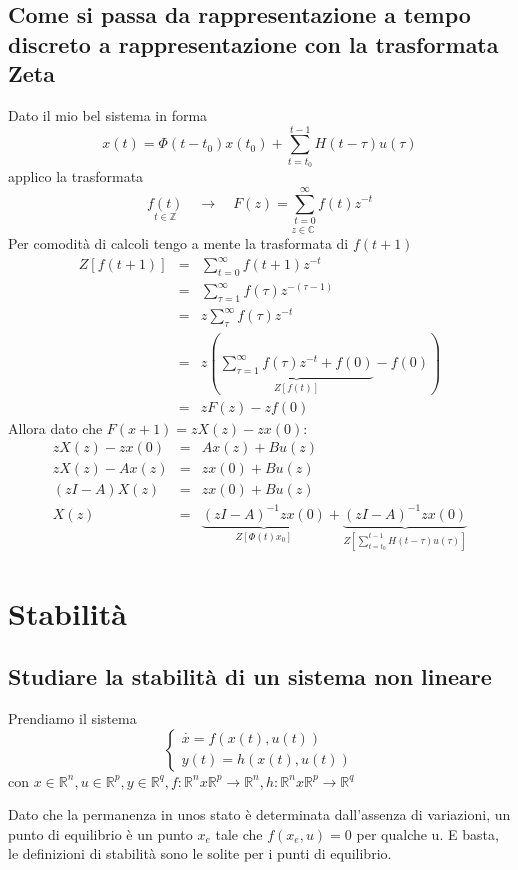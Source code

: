 \documentclass{article}
\begin{document}
\subsection{Come si passa da rappresentazione a tempo discreto a rappresentazione con la trasformata Zeta}

Dato il mio bel sistema in forma
\[
    x(t) = \Phi(t-t_0)x(t_0)+\sum_{t=t_0}^{t-1}H(t-\tau)u(\tau)
\]
applico la trasformata
\[
    \underset{t\in\mathbb{Z}}{f(t)}\quad\to\quad
    \underset{z\in\mathbb{C}}{F(z)=\sum_{t=0}^{\infty}f(t)z^{-t}}
\]
Per comodità di calcoli tengo a mente la trasformata di $f(t+1)$
\begin{align*}
    Z[f(t+1)] &=&\sum_{t=0}^{\infty}f(t+1)z^{-t}\\
    &=&\sum_{\tau=1}^{\infty}f(\tau)z^{-(\tau-1)}\\
    &=&z\sum_{\tau}^{\infty}f(\tau)z^{-t}\\
    &=&z\left( \underbrace{\sum_{\tau=1}^{\infty}f(\tau) z^{-t}+f(0)}_{Z[f(t)]}-f(0) \right)\\
    &=&zF(z)-zf(0)
\end{align*}
Allora dato che $F(x+1) = zX(z)-zx(0)$:
\begin{align*}
    zX(z)-zx(0) &=& Ax(z)+Bu(z)\\
    zX(z)-Ax(z) &=& zx(0)+Bu(z)\\
    (zI-A)X(z) &=& zx(0)+Bu(z)\\
    X(z) &=& \underbrace{(zI-A)^{-1}zx(0)}_{Z[\Phi(t)x_0]}+  \underbrace{(zI-A)^{-1}zx(0)}_{Z[\sum_{t=t_0}^{t-1}H(t-\tau)u(\tau)]}
\end{align*}


\section{Stabilità}

\subsection{Studiare la stabilità di un sistema non lineare}
Prendiamo il sistema 
\[
\begin{cases}
    \overset{\cdot}{x} = f(x(t),u(t))\\
    y(t) = h(x(t),u(t))
\end{cases}    
\]
con $x\in\mathbb{R}^n,u\in\mathbb{R}^p,y\in\mathbb{R}^q,f:\mathbb{R}^nx\mathbb{R}^p\to\mathbb{R}^n,h:\mathbb{R}^nx\mathbb{R}^p\to\mathbb{R}^q$

Dato che la permanenza in unos stato è determinata dall'assenza di variazioni, un punto di equilibrio
è un punto $x_e$ tale che $f(x_e,u) = 0$ per qualche u.
E basta, le definizioni di stabilità sono le solite per i punti di equilibrio.
\end{document}
